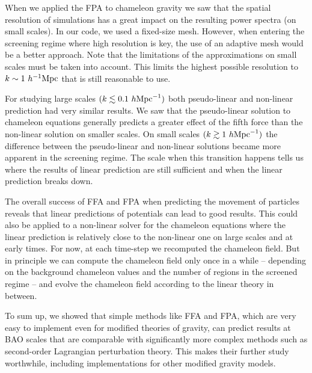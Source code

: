 When we applied the FPA to chameleon gravity we saw that the spatial resolution of simulations has a great impact on the resulting power spectra (on small scales). In our code, we used a fixed-size mesh. However, when entering the screening regime where high resolution is key, the use of an adaptive mesh would be a better approach. Note that the limitations of the approximations on small scales must be taken into account. This limits the highest possible resolution to $k\sim1~h^{-1}\text{Mpc}$ that is still reasonable to use.

For studying large scales $(k\lesssim0.1~h\text{Mpc}^{-1})$ both pseudo-linear and non-linear prediction had very similar results. We saw that the pseudo-linear solution to chameleon equations generally predicts a greater effect of the fifth force than the non-linear solution on smaller scales. On small scales $(k\gtrsim1~h\text{Mpc}^{-1})$ the difference between the pseudo-linear and non-linear solutions became more apparent in the screening regime. The scale when this transition happens tells us where the results of linear prediction are still sufficient and when the linear prediction breaks down.

The overall success of FFA and FPA when predicting the movement of particles reveals that linear predictions of potentials can lead to good results. This could also be applied to a non-linear solver for the chameleon equations where the linear prediction is relatively close to the non-linear one on large scales and at early times. For now, at each time-step we recomputed the chameleon field. But in principle we can compute the chameleon field only once in a while -- depending on the background chameleon values and the number of regions in the screened regime -- and evolve the chameleon field according to the linear theory in between.

To sum up, we showed that simple methods like FFA and FPA, which are very easy to implement even for modified theories of gravity, can predict results at BAO scales that are comparable with significantly more complex methods such as second-order Lagrangian perturbation theory. This makes their further study worthwhile, including implementations for other modified gravity models.